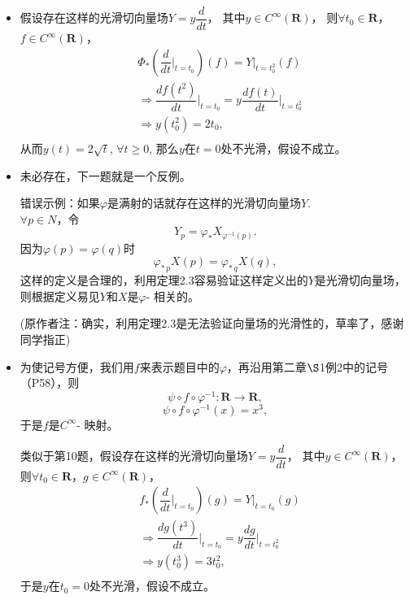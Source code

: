 \begin {itemize}
\item[7.]
	假设存在这样的光滑切向量场$Y=y\dfrac{d}{dt}$，
    其中$y \in C^\infty (\mathbf{R})$，
	则$\forall t_0 \in \mathbf{R}$，$f \in C^\infty(\mathbf{R})$，
	\begin{equation*} 
		\begin{split}
			&\Phi_*(\dfrac{d}{dt}\bigg |_{t=t_0})(f)=Y\bigg |_{t=t_0^2}(f)\\
			& \Rightarrow \dfrac{df(t^2)}{dt}\bigg |_{t=t_0}= y\dfrac{df(t)}{dt}\bigg |_{t=t_0^2}\\
			& \Rightarrow y(t_0^2)=2t_0,\\
			\end{split}
	\end{equation*}
从而$y(t)=2\sqrt{t},\,\forall t\geq0$, 那么$y$在$t=0$处不光滑，假设不成立。

\item[10.]
    未必存在，下一题就是一个反例。

    错误示例：如果$\varphi$是满射的话就存在这样的光滑切向量场$Y$.\\
    $\forall p \in N$，令
    \[Y_p=\varphi_*X_{\varphi^{-1}(p)}.\]
    因为$\varphi (p)=\varphi (q)$时
    \[\varphi_{*\,p}X(p)=\varphi_{*\,q}X(q),\]
    这样的定义是合理的，利用定理2.3容易验证这样定义出的$Y$是光滑切向量场，
    则根据定义易见$Y$和$X$是$\varphi$- 相关的。

    (原作者注：确实，利用定理2.3是无法验证向量场的光滑性的，草率了，感谢同学指正)

\item[11.]
    为使记号方便，我们用$f$来表示题目中的$\varphi$，再沿用第二章$\S$1例2中的记号（P58），则
    \[\psi\circ f\circ\varphi^{-1}:\mathbf{R}\rightarrow\mathbf{R},\]
    \[\psi\circ f\circ\varphi^{-1}(x)=x^3,\]
    于是$f$是$C^\infty$- 映射。
    
    类似于第10题，假设存在这样的光滑切向量场$Y=y\dfrac{d}{dt}$，
    其中$y \in C^\infty (\mathbf{R})$，
    则$\forall t_0 \in \mathbf{R}$，$g \in C^\infty (\mathbf{R})$，
    \begin{equation*} 
	\begin{split}
		&f_*(\dfrac{d}{dt}\bigg |_{t=t_0})(g)=Y\bigg |_{t=t_0}(g)\\
		& \Rightarrow \dfrac{dg(t^3)}{dt}\bigg |_{t=t_0}= y\dfrac{dg}{dt}\bigg |_{t=t_0^2}\\
		& \Rightarrow y(t_0^3)=3t_0^2,\\
	\end{split}
    \end{equation*}
    于是$y$在$t_0=0$处不光滑，假设不成立。


\end{itemize}
